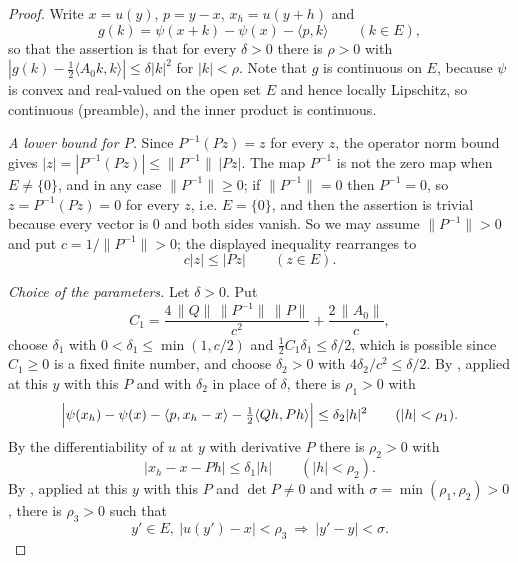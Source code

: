 \begin{proof}
Write $x=u(y)$, $p=y-x$, $x_h=u(y+h)$ and
\[
  g(k)=\psi(x+k)-\psi(x)-\langle p,k\rangle\qquad(k\in E),
\]
so that the assertion is that for every $\delta>0$ there is $\rho>0$ with
$|g(k)-\tfrac12\langle A_0k,k\rangle|\le\delta|k|^2$ for $|k|<\rho$. Note that
$g$ is continuous on $E$, because $\psi$ is convex and real-valued on the open
set $E$ and hence locally Lipschitz, so continuous (preamble), and the inner
product is continuous.

\emph{A lower bound for $P$.}
Since $P^{-1}(Pz)=z$ for every $z$, the operator norm bound gives
$|z|=|P^{-1}(Pz)|\le\|P^{-1}\|\,|Pz|$. The map $P^{-1}$ is not the zero map when
$E\ne\{0\}$, and in any case $\|P^{-1}\|\ge0$; if $\|P^{-1}\|=0$ then
$P^{-1}=0$, so $z=P^{-1}(Pz)=0$ for every $z$, i.e. $E=\{0\}$, and then the
assertion is trivial because every vector is $0$ and both sides vanish. So we
may assume $\|P^{-1}\|>0$ and put $c=1/\|P^{-1}\|>0$; the displayed inequality
rearranges to
\begin{equation}\label{eq:peea-lower}
  c|z|\le|Pz|\qquad(z\in E).
\end{equation}

\emph{Choice of the parameters.}
Let $\delta>0$. Put
\[
  C_1=\frac{4\,\|Q\|\,\|P^{-1}\|\,\|P\|}{c^2}+\frac{2\,\|A_0\|}{c},
\]
choose $\delta_1$ with $0<\delta_1\le\min(1,c/2)$ and
$\tfrac12C_1\delta_1\le\delta/2$, which is possible since $C_1\ge0$ is a fixed
finite number, and choose $\delta_2>0$ with $4\delta_2/c^2\le\delta/2$. By
, applied at this $y$ with this $P$ and with
$\delta_2$ in place of $\delta$, there is $\rho_1>0$ with
\begin{equation}\label{eq:peea-curve}
  \Bigl|\psi(x_h)-\psi(x)-\langle p,x_h-x\rangle
    -\tfrac12\langle Qh,Ph\rangle\Bigr|\le\delta_2|h|^2\qquad(|h|<\rho_1).
\end{equation}
By the differentiability of $u$ at $y$ with derivative $P$ there is $\rho_2>0$
with
\begin{equation}\label{eq:peea-rho}
  |x_h-x-Ph|\le\delta_1|h|\qquad(|h|<\rho_2).
\end{equation}
By , applied at this $y$ with this $P$ and
$\det P\ne0$ and with $\sigma=\min(\rho_1,\rho_2)>0$, there is $\rho_3>0$ such
that
\begin{equation}\label{eq:peea-loc}
  y'\in E,\ |u(y')-x|<\rho_3\ \Longrightarrow\ |y'-y|<\sigma .
\end{equation}


\end{proof}
